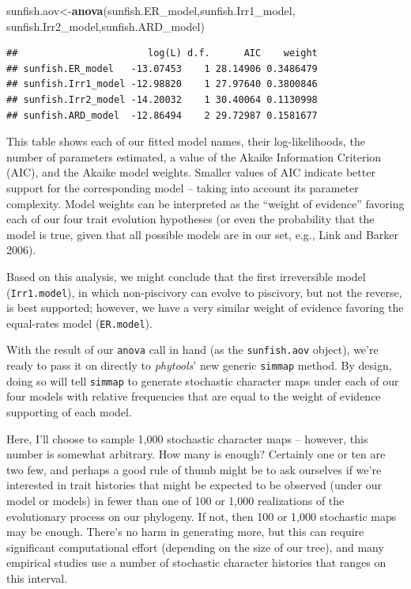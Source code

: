 \documentclass[fleqn,10pt,lineno]{wlpeerj} %
\newenvironment{Shaded}{\begin{snugshade}}{\end{snugshade}}
\newcommand{\FunctionTok}[1]{\textcolor[rgb]{0.13,0.29,0.53}{\textbf{#1}}}
\newcommand{\NormalTok}[1]{#1}
\newcommand{\OtherTok}[1]{\textcolor[rgb]{0.56,0.35,0.01}{#1}}
\begin{document}
\begin{Shaded}
\begin{Highlighting}[]
\NormalTok{sunfish.aov}\OtherTok{\textless{}{-}}\FunctionTok{anova}\NormalTok{(sunfish.ER\_model,sunfish.Irr1\_model,}
\NormalTok{  sunfish.Irr2\_model,sunfish.ARD\_model)}
\end{Highlighting}
\end{Shaded}

\begin{verbatim}
##                       log(L) d.f.      AIC    weight
## sunfish.ER_model   -13.07453    1 28.14906 0.3486479
## sunfish.Irr1_model -12.98820    1 27.97640 0.3800846
## sunfish.Irr2_model -14.20032    1 30.40064 0.1130998
## sunfish.ARD_model  -12.86494    2 29.72987 0.1581677
\end{verbatim}

This table shows each of our fitted model names, their log-likelihoods, the number of parameters estimated, a value of the Akaike Information Criterion (AIC), and the Akaike model weights. Smaller values of AIC indicate better support for the corresponding model -- taking into account its parameter complexity. Model weights can be interpreted as the ``weight of evidence'' favoring each of our four trait evolution hypotheses (or even the probability that the model is true, given that all possible models are in our set, e.g., Link and Barker 2006).

Based on this analysis, we might conclude that the first irreversible model (\texttt{Irr1.model}), in which non-piscivory can evolve to piscivory, but not the reverse, is best supported; however, we have a very similar weight of evidence favoring the equal-rates model (\texttt{ER.model}).

With the result of our \texttt{anova} call in hand (as the \texttt{sunfish.aov} object), we're ready to pass it on directly to \emph{phytools}' new generic \texttt{simmap} method. By design, doing so will tell \texttt{simmap} to generate stochastic character maps under each of our four models with relative frequencies that are equal to the weight of evidence supporting of each model.

Here, I'll choose to sample 1,000 stochastic character maps -- however, this number is somewhat arbitrary. How many is enough? Certainly one or ten are two few, and perhaps a good rule of thumb might be to ask ourselves if we're interested in trait histories that might be expected to be observed (under our model or models) in fewer than one of 100 or 1,000 realizations of the evolutionary process on our phylogeny. If not, then 100 or 1,000 stochastic maps may be enough. There's no harm in generating more, but this can require significant computational effort (depending on the size of our tree), and many empirical studies use a number of stochastic character histories that ranges on this interval.
\end{document}
